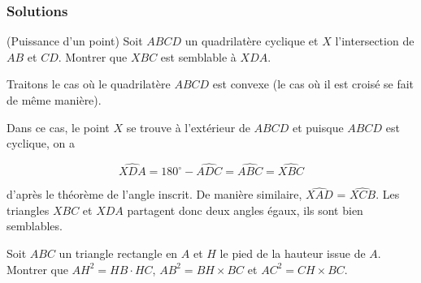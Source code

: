 \subsubsection{Solutions}

\setcounter{exo}{0}

\begin{exo}
(Puissance d'un point)
Soit $ABCD$ un quadrilatère cyclique et $X$ l’intersection de $AB$ et $CD$. Montrer que $XBC$ est semblable à $XDA$.
\end{exo}

\begin{sol}
\begin{center}
\end{center}

Traitons le cas où le quadrilatère $ ABCD$ est convexe (le cas où il est croisé se fait de même manière).

Dans ce cas, le point $X$ se trouve à l'extérieur de $ABCD$ et puisque $ABCD$ est cyclique, on a

\[\widehat{XDA}=180^\circ-\widehat{ADC}= \widehat{ABC}=\widehat{XBC}\]

d'après le théorème de l'angle inscrit. De manière similaire, $\widehat{XAD}$ = $\widehat{XCB}$. Les triangles $XBC$ et $XDA$ partagent donc deux angles égaux, ils sont bien semblables.
\end{sol}

\begin{exo}
Soit $ABC$ un triangle rectangle en $A$ et $H$ le pied de la hauteur issue de $A$. Montrer que $AH^2 = HB \cdot HC$, $AB^2=BH\times BC$ et $AC^2=CH\times BC$.
\end{exo}

